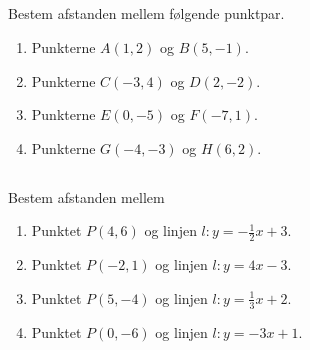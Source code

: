 \documentclass[10pt,a4paper,table]{article}
\begin{document}
\subsection{}
Bestem afstanden mellem følgende punktpar.
\begin{enumerate}
  \item Punkterne $A(1,2)$ og $B(5,-1)$.
  \item Punkterne $C(-3,4)$ og $D(2,-2)$.
  \item Punkterne $E(0,-5)$ og $F(-7,1)$.
  \item Punkterne $G(-4,-3)$ og $H(6,2)$.
\end{enumerate}

\subsection{}
Bestem afstanden mellem
\begin{enumerate}
  \item Punktet $P(4,6)$ og linjen $l: y=-\frac{1}{2}x+3$.
  \item Punktet $P(-2,1)$ og linjen $l: y=4x-3$.
  \item Punktet $P(5,-4)$ og linjen $l: y=\frac{1}{3}x+2$.
  \item Punktet $P(0,-6)$ og linjen $l: y=-3x+1$.
\end{enumerate}
\end{document}
